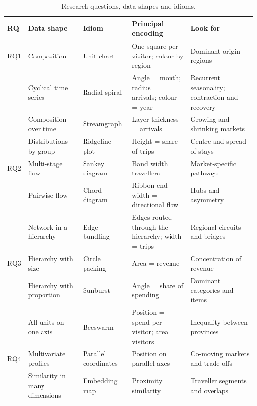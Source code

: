 \documentclass[11pt,a4paper]{article}
\begin{document}
\begin{table}[!htbp]
\centering
\caption{Research questions, data shapes and idioms.}
\label{tab:framework}
\small
\renewcommand{\arraystretch}{1.1}
\begin{tabularx}{\linewidth}{@{}l>{\raggedright\arraybackslash}p{2.9cm}>{\raggedright\arraybackslash}p{2.75cm}>{\raggedright\arraybackslash}X>{\raggedright\arraybackslash}X@{}}
\toprule
RQ & Data shape & Idiom & Principal encoding & Look for \\
\midrule
RQ1 & Composition & Unit chart & One square per visitor; colour by region & Dominant origin regions \\
    & Cyclical time series & Radial spiral & Angle = month; radius = arrivals; colour = year & Recurrent seasonality; contraction and recovery \\
    & Composition over time & Streamgraph & Layer thickness = arrivals & Growing and shrinking markets \\
    & Distributions by group & Ridgeline plot & Height = share of trips & Centre and spread of stays \\
\midrule
RQ2 & Multi-stage flow & Sankey diagram & Band width = travellers & Market-specific pathways \\
    & Pairwise flow & Chord diagram & Ribbon-end width = directional flow & Hubs and asymmetry \\
    & Network in a hierarchy & Edge bundling & Edges routed through the hierarchy; width = trips & Regional circuits and bridges \\
\midrule
RQ3 & Hierarchy with size & Circle packing & Area = revenue & Concentration of revenue \\
    & Hierarchy with proportion & Sunburst & Angle = share of spending & Dominant categories and items \\
    & All units on one axis & Beeswarm & Position = spend per visitor; area = visitors & Inequality between provinces \\
\midrule
RQ4 & Multivariate profiles & Parallel coordinates & Position on parallel axes & Co-moving markets and trade-offs \\
    & Similarity in many dimensions & Embedding map & Proximity = similarity & Traveller segments and overlaps \\
\bottomrule
\end{tabularx}
\end{table}
\end{document}
